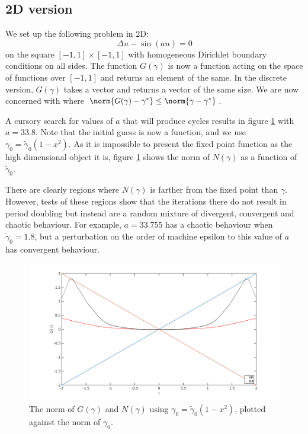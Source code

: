 \documentclass{article}
\begin{document}
\subsection{2D version}

We set up the following problem in 2D:
\begin{equation*}
\Delta u - \sin(au) = 0
\end{equation*}
on the square $[-1,1] \times [-1,1]$ with homogeneous Dirichlet boundary conditions on all sides.
The function $G(\gamma)$ is now a function acting on the space of functions over $[-1,1]$ and returns an element of the same.
In the discrete version, $G(\gamma)$ takes a vector and returns a vector of the same size.
We are now concerned with where $\norm{G(\gamma) - \gamma^*} \leq \norm{\gamma - \gamma^*}$.

A cursory search for values of $a$ that will produce cycles results in figure \ref{fig:Lap1} with $a = 33.8$.
Note that the initial guess is now a function, and we use $\gamma_0 = \tilde{\gamma}_0 (1 - x^2)$.
As it is impossible to present the fixed point function as the high dimensional object it is, figure \ref{fig:Lap1} shows the norm of $N(\gamma)$ as a function of $\tilde{\gamma}_0$.

There are clearly regions where $N(\gamma)$ is farther from the fixed point than $\gamma$.
However, tests of these regions show that the iterations there do not result in period doubling but instead are a random mixture of divergent, convergent and chaotic behaviour.
For example, $a = 33.755$ has a chaotic behaviour when $\tilde{\gamma}_0 = 1.8$, but a perturbation on the order of machine epsilon to this value of $a$ has convergent behaviour.

\begin{figure}
\includegraphics[width=\textwidth]{exp16_01.png}
\caption{The norm of $G(\gamma)$ and $N(\gamma)$ using $\gamma_0 = \tilde{\gamma}_0 (1 - x^2)$, plotted against the norm of $\gamma_0$.}
\label{fig:Lap1}
\end{figure}
\end{document}
